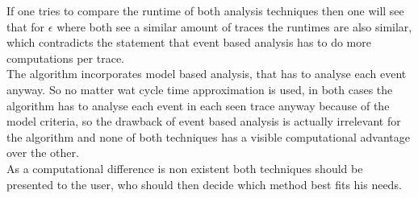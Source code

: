 \documentclass[
	a4paper,
	pagesize,
	pdftex,
	12pt,
	twoside, %
	BCOR=5mm, %
	ngerman,
	fleqn,
	final,
	]{scrartcl}
\begin{document}
If one tries to compare the runtime of both analysis techniques then one will see that for $\epsilon$ where both see a similar amount of traces the runtimes are also similar, which contradicts the statement that event based analysis has to do more computations per trace.\\
The algorithm incorporates model based analysis, that has to analyse each event anyway. So no matter wat cycle time approximation is used, in both cases the algorithm has to analyse each event in each seen trace anyway because of the model criteria, so the drawback of event based analysis is actually irrelevant for the algorithm and none of both techniques has a visible computational advantage over the other.\\
As a computational difference is non existent both techniques should be presented to the user, who should then decide which method best fits his needs.
\end{document}
